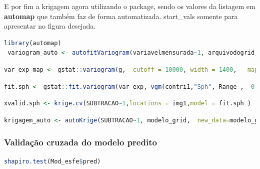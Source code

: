 \hspace*{1.25 cm}  E por fim a krigagem agora utilizando o package, sendo os valores da listagem em  \textbf{\textcolor{blue!55!black}{automap}} que também faz de forma automatizada. start\_vals somente para apresentar no figura desejada.
  \lstset{
 	language=R, %
 	caption= Auto ajuste do Variograma em linguagem R,} %
 \begin{lstlisting}[language=R]
   library(automap)
 variogram_auto <- autofitVariogram(variavelmensurada~1, arquivodogrid, start_vals=c(variogramar$nugget, variogramar$cov.pars[2], variograma$cov.pars[1]))
 \end{lstlisting}  
 
  \lstset{
	language=R, %
	caption= Mapa variografico em linguagem R,} %
\begin{lstlisting}[language=R]
	var_exp_map <- gstat::variogram(g, 	cutoff = 10000,	width = 1400, 	map = T)
\end{lstlisting}  
 
   \lstset{
 	language=R, %
 	caption= Variograma utilizando funcao esférica em linguagem R,} %
 \begin{lstlisting}[language=R]
 	fit.sph <- gstat::fit.variogram(var_exp, vgm(contri1,"Sph", Range ,  0.01))
 \end{lstlisting}  
 
  \lstset{
	language=R, %
	caption= Validação cruzada em linguagem R,} %
\begin{lstlisting}[language=R]
	xvalid.sph <- krige.cv(SUBTRACAO~1,locations = img1,model = fit.sph ) 
\end{lstlisting}  

  \lstset{
	language=R, %
	caption= Krigagem em linguagem R,} %
\begin{lstlisting}[language=R]
	krigagem_auto <- autoKrige(SUBTRACAO~1, modelo_grid,  new_data=modelo_grid, start_vals=c(variofit_geor$nugget, variofit_geor$cov.pars[2], variofit_geor$cov.pars[1]))
\end{lstlisting}  
 
\subsubsection{Validação cruzada do modelo predito }
 
  \lstset{
	language=R, %
	caption= Teste de Shapiro-Wilk  em linguagem R,} %
\begin{lstlisting}[language=R]
	shapiro.test(Mod_esfe$pred)
\end{lstlisting}  
 

